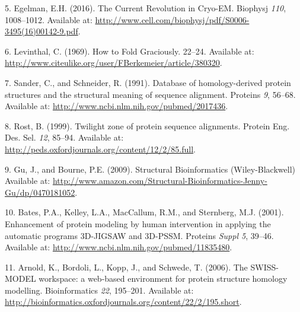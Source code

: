 \documentclass[12pt,a4paper,twoside]{book}
\theoremstyle{definition}
\theoremstyle{definition}
\theoremstyle{remark}
\begin{document}
\hypertarget{ref-Egelman2016}{}
5. Egelman, E.H. (2016). The Current Revolution in Cryo-EM. Biophysj
\emph{110}, 1008--1012. Available at:
\url{http://www.cell.com/biophysj/pdf/S0006-3495(16)00142-9.pdf}.

\hypertarget{ref-Levinthal1969}{}
6. Levinthal, C. (1969). How to Fold Graciously. 22--24. Available at:
\url{http://www.citeulike.org/user/FBerkemeier/article/380320}.

\hypertarget{ref-Sander1991}{}
7. Sander, C., and Schneider, R. (1991). Database of homology-derived
protein structures and the structural meaning of sequence alignment.
Proteins \emph{9}, 56--68. Available at:
\url{http://www.ncbi.nlm.nih.gov/pubmed/2017436}.

\hypertarget{ref-Rost1999}{}
8. Rost, B. (1999). Twilight zone of protein sequence alignments.
Protein Eng. Des. Sel. \emph{12}, 85--94. Available at:
\url{http://peds.oxfordjournals.org/content/12/2/85.full}.

\hypertarget{ref-Gu2009}{}
9. Gu, J., and Bourne, P.E. (2009). Structural Bioinformatics
(Wiley-Blackwell) Available at:
\url{http://www.amazon.com/Structural-Bioinformatics-Jenny-Gu/dp/0470181052}.

\hypertarget{ref-Bates2001}{}
10. Bates, P.A., Kelley, L.A., MacCallum, R.M., and Sternberg, M.J.
(2001). Enhancement of protein modeling by human intervention in
applying the automatic programs 3D-JIGSAW and 3D-PSSM. Proteins
\emph{Suppl 5}, 39--46. Available at:
\url{http://www.ncbi.nlm.nih.gov/pubmed/11835480}.

\hypertarget{ref-Arnold2006}{}
11. Arnold, K., Bordoli, L., Kopp, J., and Schwede, T. (2006). The
SWISS-MODEL workspace: a web-based environment for protein structure
homology modelling. Bioinformatics \emph{22}, 195--201. Available at:
\url{http://bioinformatics.oxfordjournals.org/content/22/2/195.short}.
\end{document}
